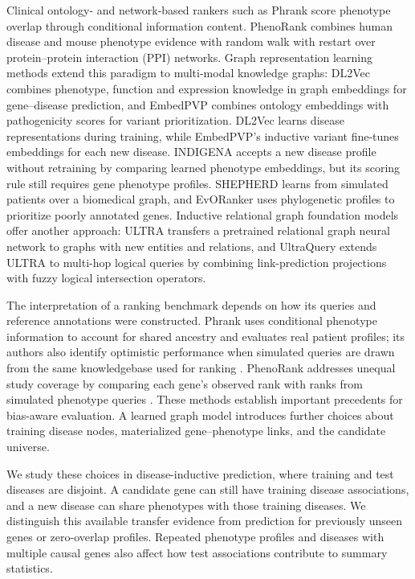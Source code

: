 \documentclass[webpdf,contemporary,large]{oup-authoring-template}%
\theoremstyle{thmstyleone}%
\theoremstyle{thmstyletwo}%
\theoremstyle{thmstylethree}%
\renewcommand{\cite}{\citep}
\begin{document}
Clinical ontology- and network-based rankers such as Phrank
\cite{jagadeesh2019phrank} score phenotype overlap through conditional
information content. PhenoRank \cite{cornish2018phenorank} combines human
disease and mouse phenotype evidence with random walk with restart over
protein--protein interaction (PPI) networks. Graph representation learning methods extend this
paradigm to multi-modal knowledge graphs: DL2Vec \cite{chen2021predicting}
combines phenotype, function and expression knowledge in graph embeddings for
gene--disease prediction, and EmbedPVP \cite{althagafi2024prioritizing} combines
ontology embeddings with pathogenicity scores for variant prioritization. DL2Vec
learns disease representations during training, while EmbedPVP's inductive
variant fine-tunes embeddings for each new disease. INDIGENA \cite{indigena}
accepts a new disease profile without retraining by comparing learned phenotype
embeddings, but its scoring rule still requires gene phenotype profiles.
SHEPHERD \cite{alsentzer2025shepherd} learns from simulated patients over a
biomedical graph, and EvORanker \cite{canavati2024evoranker} uses phylogenetic
profiles to prioritize poorly annotated genes. Inductive relational graph
foundation models offer another approach: ULTRA \cite{ultra} transfers a
pretrained relational graph neural network to graphs with new entities and
relations, and UltraQuery \cite{galkin2024ultraquery} extends ULTRA to multi-hop
logical queries by combining link-prediction projections with fuzzy logical
intersection operators.

The interpretation of a ranking benchmark depends on how its queries and
reference annotations were constructed. Phrank uses conditional phenotype
information to account for shared ancestry and evaluates real patient profiles;
its authors also identify optimistic performance when simulated queries are
drawn from the same knowledgebase used for ranking \cite{jagadeesh2019phrank}.
PhenoRank addresses unequal study coverage by comparing each gene's observed
rank with ranks from simulated phenotype queries \cite{cornish2018phenorank}.
These methods establish important precedents for bias-aware evaluation. A
learned graph model introduces further choices about training disease nodes,
materialized gene--phenotype links, and the candidate universe.

We study these choices in disease-inductive prediction, where training and test
diseases are disjoint. A candidate gene can still have training disease
associations, and a new disease can share phenotypes with those training
diseases. We distinguish this available transfer evidence from prediction for
previously unseen genes or zero-overlap profiles. Repeated phenotype profiles
and diseases with multiple causal genes also affect how test associations
contribute to summary statistics.
\end{document}
